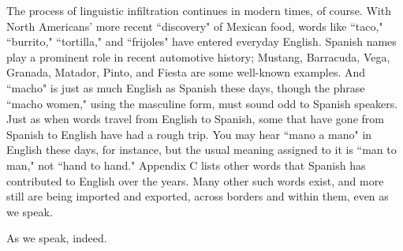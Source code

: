 The process of linguistic infiltration continues in modern
times, of course. With North Americans' more recent ``discovery" of
Mexican food, words like ``taco," ``burrito," ``tortilla," and ``frijoles"
have entered everyday English. Spanish names play a prominent role in
recent automotive history; Mustang, Barracuda, Vega, Granada, Matador, Pinto, and Fiesta are some well-known examples. And ``macho" is
just as much English as Spanish these days, though the phrase ``macho
women," using the masculine form, must sound odd to Spanish speakers. Just as when words travel from English to Spanish, some that have
gone from Spanish to English have had a rough trip. You may hear ``mano
a mano" in English these days, for instance, but the usual meaning assigned to it is ``man to man," not ``hand to hand." Appendix C lists
other words that Spanish has contributed to English over the years.
Many other such words exist, and more still are being imported and
exported, across borders and within them, even as we speak.

As we speak, indeed.

